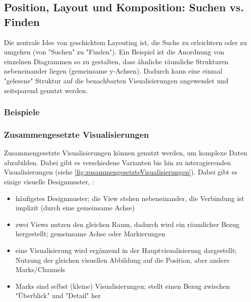 		\subsection{Position, Layout und Komposition: Suchen vs. Finden}
			Die zentrale Idee von geschicktem Layouting ist, die Suche zu erleichtern oder zu umgehen (von "Suchen" zu "Finden"). Ein Beispiel ist die Anordnung von einzelnen Diagrammen so zu gestalten, dass ähnliche räumliche Strukturen nebeneinander liegen (\zB gemeinsame y-Achsen). Dadurch kann eine einmal "gelesene" Struktur auf die benachbarten Visualisierungen angewendet und zeitsparend genutzt werden.

			\subsubsection{Beispiele}

			\subsubsection{Zusammengesetzte Visualisierungen}
				Zusammengesetzte Visualisierungen können genutzt werden, um komplexe Daten abzubilden. Dabei gibt es verschiedene Varianten bis hin zu interagierenden Visualisierungen (siehe \autoref{fig:zusammengesetzteVisualisierungen}). Dabei gibt es einige visuelle Designmuster, \zB:
				\begin{itemize}
					\item {} häufigstes Designmuster; die View stehen nebeneinander, die Verbindung ist implizit (\zB durch eine gemeinsame Achse)
					\item {} zwei Views nutzen den gleichen Raum, dadurch wird ein räumlicher Bezug hergestellt; gemeinsame Achse oder Markierungen
					\item {} eine Visualisierung wird ergänzend in der Hauptvisualisierung dargestellt; Nutzung der gleichen visuellen Abbildung auf die Position, aber \ggf andere Marks/Channels
					\item {} Marks sind selbst (kleine) Visualisierungen; stellt einen Bezug zwischen "Überblick" und "Detail" her
				\end{itemize}


